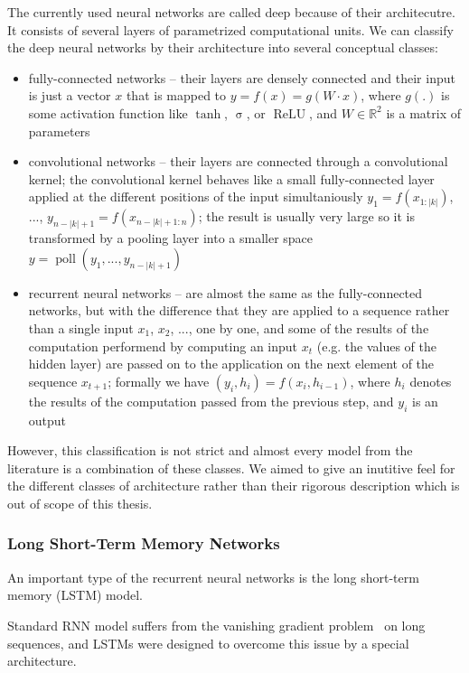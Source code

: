 \documentclass[10pt,twocolumn]{article}
\begin{document}
The currently used neural networks are called deep because of their architecutre. It consists of several layers of parametrized computational units. We can classify the deep neural networks by their architecture into several conceptual classes:
\begin{itemize}
  \item fully-connected networks -- their layers are densely connected and their input is just a vector $x$ that is mapped to $y=f(x)=g(W\cdot x)$, where $g(.)$ is some activation function like $\operatorname{tanh}$, $\operatorname{\sigma}$, or $\operatorname{ReLU}$, and $W\in \mathbb{R}^2$ is a matrix of parameters
  \item convolutional networks -- their layers are connected through a convolutional kernel; the convolutional kernel behaves like a small fully-connected layer applied at the different positions of the input simultaniously $y_1=f(x_{1:|k|})$, ..., $y_{n-|k|+1}=f(x_{n-|k|+1:n})$; the result is usually very large so it is transformed by a pooling layer into a smaller space $y=\operatorname{poll}(y_1, ..., y_{n-|k|+1})$
  \item recurrent neural networks -- are almost the same as the fully-connected networks, but with the difference that they are applied to a sequence rather than a single input $x_1$, $x_2$, ..., one by one, and some of the results of the computation performend by computing an input $x_t$ (e.g. the values of the hidden layer) are passed on to the application on the next element of the sequence $x_{t+1}$; formally we have $(y_i, h_i) = f(x_i, h_{i-1})$, where $h_i$ denotes the results of the computation passed from the previous step, and $y_i$ is an output
\end{itemize}
However, this classification is not strict and almost every model from the literature is a combination of these classes. We aimed to give an inutitive feel for the different classes of architecture rather than their rigorous description which is out of scope of this thesis.

\subsubsection{Long Short-Term Memory Networks}
An important type of the recurrent neural networks is the long short-term memory (LSTM) model.

Standard RNN model suffers from the vanishing gradient problem~\cite{bengio1994learning} on long sequences, and LSTMs were designed to overcome this issue by a special architecture.
\end{document}
